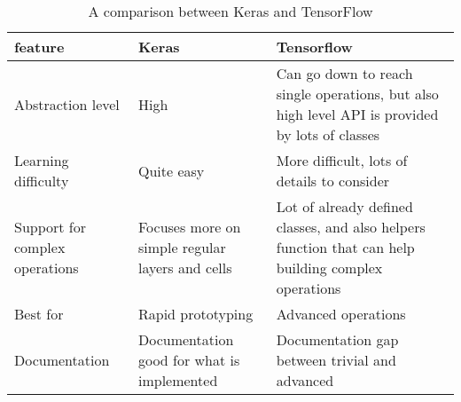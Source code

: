 
\begin{table}
  \begin{tabularx}{\textwidth}{XXX}
    \toprule
    \textbf{feature} & \textbf{Keras} & \textbf{Tensorflow} \\
    \midrule
    Abstraction level & High & Can go down to reach single operations, but also high level API is provided by lots of classes \\
    \midrule
    Learning difficulty & Quite easy & More difficult, lots of details to consider \\
    \midrule
    Support for complex operations & Focuses more on simple regular layers and cells & Lot of already defined classes, and also helpers function that can help building complex operations \\
    \midrule
    Best for & Rapid prototyping & Advanced operations \\
    \midrule
    Documentation & Documentation good for what is implemented & Documentation gap between trivial and advanced \\
    \bottomrule
  \end{tabularx}
  \caption{A comparison between Keras and TensorFlow}\label{tab:kerasVsTf}
\end{table}
